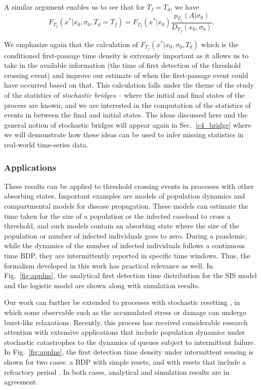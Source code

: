 A similar argument enables us to see that for $T_f = T_d$, we have
\begin{equation}
F_{T_f}(x^*|x_0, \sigma_0,T_d=T_f)=F_{T_f}(x^*|x_0) \frac{p_{T_f}(A|\sigma_0)}{D_{T_f}(x_0,\sigma_0)}.
\end{equation}

We emphasize again that the calculation of $F_{T_f}(x^*|x_0,\sigma_0, T_d)$ which is the conditioned first-passage time density is extremely important as it allows us to take in the available information (the time of first detection of the threshold crossing event) and improve our estimate of when the first-passage event could have occurred based on that. This calculation falls under the theme of the study of the statistics of \emph{stochastic bridges} -- where the initial and final states of the process are known, and we are interested in the computation of the statistics of events in between the final and initial states. The ideas discussed here and the general notion of stochastic bridges will appear again in Sec.~\ref{c4_bridge} where we will demonstrate how these ideas can be used to infer missing statistics in real-world time-series data.


\subsubsection{Applications} 

These results can be applied to threshold crossing events in processes with other absorbing states. Important examples are models of population dynamics and compartmental models for disease propagation. These models can estimate the time taken for the size of a population or the infected caseload to cross a threshold, and such models contain an absorbing state where the size of the population or number of infected individuals goes to zero. During a pandemic, while the dynamics of the number of infected individuals follows a continuous time BDP, they are intermittently reported in specific time windows. Thus, the formalism developed in this work has practical relevance as well. In Fig.~\ref{fig:applns}, the analytical first detection time distribution for the SIS model and the logistic model are shown along with simulation results. 


Our work can further be extended to processes with stochastic resetting \cite{evans_diffusion_2011,reuveni_optimal_2016,pal_first_2017,evans_stochastic_2020,pal_search_2020,pal_first_2019}, in which some observable such as the accumulated stress or damage can undergo burst-like relaxations. Recently, this process has received considerable research attention with extensive applications that include population dynamics under stochastic catastrophes \cite{di_crescenzo_note_2008,di_crescenzo_mm1_2003,kumar_transient_2000} to the dynamics of queues subject to intermittent failure. In Fig.~\ref{fig:applns}, the first detection time density under intermittent sensing is shown for two cases: a BDP with simple resets, and with resets that include a refractory period \cite{evans_effects_2018}. In both cases, analytical and simulation results are in agreement. 

